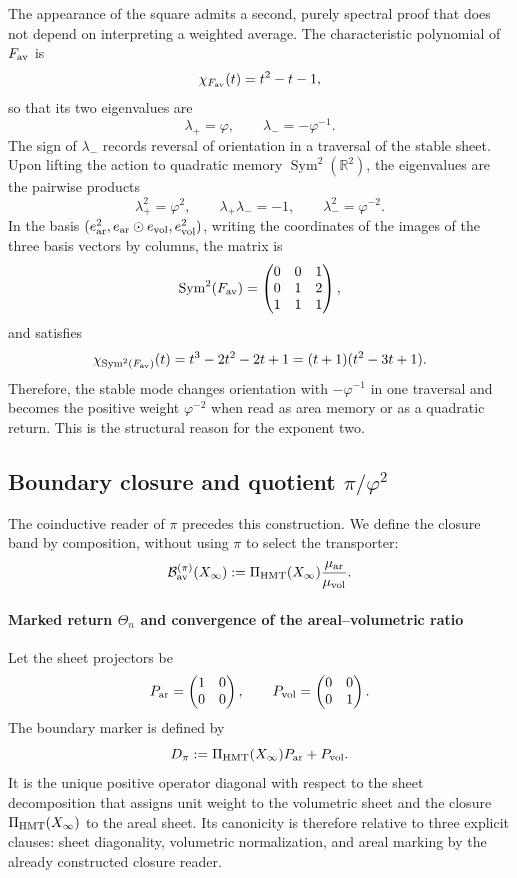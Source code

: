 The appearance of the square admits a second, purely spectral proof that
does not depend on interpreting a weighted average. The characteristic
polynomial of \(F_{\rm av}\) is
\[
 \chi_{F_{\rm av}}(t)=t^2-t-1,
\]
so that its two eigenvalues are
\[
 \lambda_+=\varphi,\qquad \lambda_-=-\varphi^{-1}.
\]
The sign of \(\lambda_-\) records reversal of orientation in a traversal of
the stable sheet. Upon lifting the action to quadratic memory
\(\operatorname{Sym}^2(\mathbb R^2)\), the eigenvalues are the pairwise products
\[
 \lambda_+^2=\varphi^2,\qquad
 \lambda_+\lambda_-=-1,\qquad
 \lambda_-^2=\varphi^{-2}.
\]
In the basis
\((e_{\rm ar}^2,e_{\rm ar}\odot e_{\rm vol},e_{\rm vol}^2)\), writing the coordinates of the images of the three basis vectors
by columns, the matrix is
\[
 \operatorname{Sym}^2(F_{\rm av})=
 \begin{pmatrix}
 0&0&1\\
 0&1&2\\
 1&1&1
 \end{pmatrix},
\]
and satisfies
\[
 \chi_{\operatorname{Sym}^2(F_{\rm av})}(t)
 =t^3-2t^2-2t+1
 =(t+1)(t^2-3t+1).
\]
Therefore, the stable mode changes orientation with
\(-\varphi^{-1}\) in one traversal and becomes the positive weight
\(\varphi^{-2}\) when read as area memory or as a
quadratic return. This is the structural reason for the exponent two.

\subsection{Boundary closure and quotient \texorpdfstring{$\pi/\varphi^2$}{pi/phi2}}

The coinductive reader of \(\pi\) precedes this construction. We define the
closure band by composition, without using \(\pi\) to select the
transporter:
\[
 \mathcal B_{\rm av}^{(\pi)}(X_\infty)
 :=\Pi_{\rm HMT}(X_\infty)
 \frac{\mu_{\rm ar}}{\mu_{\rm vol}}.
\]

\paragraph{Marked return \(\Theta_n\) and convergence of the areal–volumetric ratio}
Let the sheet projectors be
\[
 P_{\rm ar}=\begin{pmatrix}1&0\\0&0\end{pmatrix},
 \qquad
 P_{\rm vol}=\begin{pmatrix}0&0\\0&1\end{pmatrix}.
\]
The boundary marker is defined by
\[
 D_\pi:=\Pi_{\rm HMT}(X_\infty)P_{\rm ar}+P_{\rm vol}.
\]
It is the unique positive operator diagonal with respect to the sheet
decomposition that assigns unit weight to the volumetric sheet and the closure
\(\Pi_{\rm HMT}(X_\infty)\) to the areal sheet. Its canonicity is therefore
relative to three explicit clauses: sheet diagonality, volumetric normalization,
and areal marking by the already constructed closure reader.

